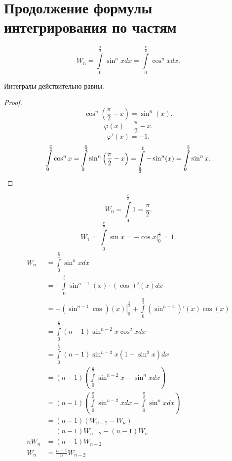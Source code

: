 \documentclass[11pt, oneside]{article}   	%
\begin{document}
\section{Продолжение формулы интегрирования по частям}
\begin{definition}
    \[ W_n = \int\limits_{0}^{\frac{\pi}{2}} \sin^{n} x dx = \int\limits_{0}^{\frac{\pi}{2}} \cos^{n} xdx .\]
\end{definition}
\begin{dlemma}
    Интегралы действительно равны.
    \begin{proof}
        \[ \cos^{n}\left(\frac{\pi}{2}-x\right) = \sin^{n}(x) .\]
        \[ \varphi(x) = \frac{\pi}{2}-x .\]
        \[ \varphi'(x) = -1 .\]
        \[ \int\limits_{0}^{\frac{\pi}{2}} \cos^{n} x = \int\limits_{0}^{\frac{\pi}{2}} \sin^{n}\left(\frac{\pi}{2}-x\right) = \int\limits_{\frac{\pi}{2}}^{0} -\sin^{n}(x) = \int\limits_{0}^{\frac{\pi}{2}} \sin^{n} x       .\qedhere\] 
    \end{proof}
\end{dlemma}
\begin{dlemma}
    \[ W_0 = \int\limits_{0}^{\frac{\pi}{2}} 1 = \frac{\pi}{2}  .\]
    \[ W_1 = \int\limits_{0}^{\frac{\pi}{2}} \sin x = \left. -\cos x\right|_{0}^{\frac{\pi}{2}} = 1   .\]
        \begin{equation*}
            \begin{split}
                W_{n} &= \int\limits_{0}^{\frac{\pi}{2}} \sin^{n} x dx \\
                      &= -\int\limits_{0}^{\frac{\pi}{2}} \sin^{n-1}(x) \cdot (\cos)'(x) dx \\
                      &= -\left.(\sin^{n-1}\cos)(x)\right|_{0}^{\frac{\pi}{2}} + \int\limits_{0}^{\frac{\pi}{2}} (\sin^{n-1})'(x) \cos (x)\\ 
                      &= \int\limits_{0}^{\frac{\pi}{2}} (n-1)\sin^{n-2}x\cos^2 x dx\\
                      &= \int\limits_{0}^{\frac{\pi}{2}} (n-1)\sin^{n-2}x(1-\sin^2 x)dx\\
                      &= (n-1)\left( \int\limits_{0}^{\frac{\pi}{2}}\sin^{n-2} x -\sin^{n} x dx  \right)\\
                      &= (n-1)\left(\int\limits_{0}^{\frac{\pi}{2}} \sin^{n-2}xdx - \int\limits_{0}^{\frac{\pi}{2}}\sin^{n} xdx \right)\\
                      &= (n-1)\left( W_{n-2} - W_n \right)\\
                      &= (n-1)W_{n-2} - (n-1)W_{n}\\
                 nW_n &= (n-1)W_{n-2}\\
                  W_n &= \frac{n-1}{n}W_{n-2}
            \end{split}
        \end{equation*}
\end{dlemma}
\end{document}
